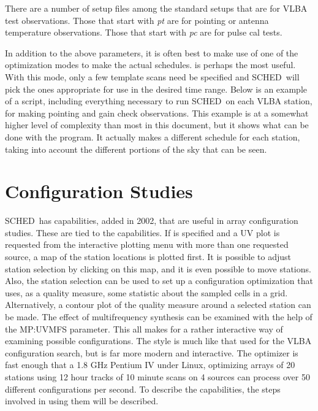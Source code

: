 \documentclass{report}
\newcommand{\schedb}{{\sc SCHED~}}
\begin{document}
There are a number of setup files among the standard setups that are
for VLBA test observations.  Those that start with {\sl pt} are for
pointing or antenna temperature observations.  Those that start with
{\sl pc} are for pulse cal tests.

In addition to the above parameters, it is often best to make use
of one of the optimization modes to make the actual schedules.
 is perhaps the most
useful.  With this mode, only a few template scans need be specified
and \schedb will pick the ones appropriate for use in the desired
time range.  Below is an example of a script, including everything
necessary to run \schedb on each VLBA station, for making pointing
and gain check observations.  This example is at a somewhat higher
level of complexity than most in this document, but it shows what
can be done with the program.  It actually makes a different schedule
for each station, taking into account the different portions of
the sky that can be seen.



\section{\label{SEC:CONFIG}Configuration Studies}

\schedb has capabilities, added in 2002, that are useful in array
configuration studies.  These are tied to the
 capabilities.  If  is specified and a UV plot is requested from the
interactive plotting menu with more than one requested source, a map
of the station locations is plotted first.  It is possible to adjust
station selection by clicking on this map, and it is even possible to
move stations.  Also, the station selection can be used to set up a
configuration optimization that uses, as a quality measure, some
statistic about the sampled cells in a grid.  Alternatively, a contour
plot of the quality measure around a selected station can be made.
The effect of multifrequency synthesis can be examined with the help
of the  {MP:UVMFS} parameter.  This all makes for
a rather interactive way of examining possible configurations.  The
style is much like that used for the VLBA configuration search, but is
far more modern and interactive.  The optimizer is fast enough that a
1.8 GHz Pentium IV under Linux, optimizing arrays of 20 stations using
12 hour tracks of 10 minute scans on 4 sources can process over 50
different configurations per second.  To describe the capabilities,
the steps involved in using them will be described.
\end{document}
